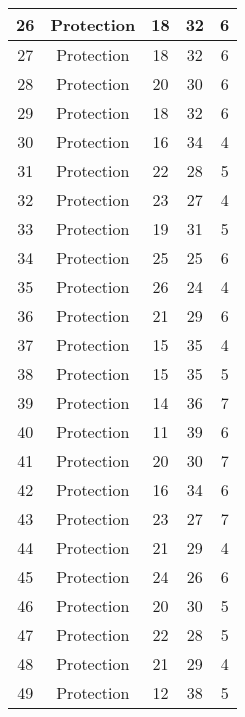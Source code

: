 \documentclass[results.tex]{subfiles}
\begin{document}
\begin{center}
\begin{tabular}{| c || c | c | c | c |}
    \hline
    26 & Protection & 18 & 32 & 6 \\ 
    \hline
    27 & Protection & 18 & 32 & 6 \\ 
    \hline
    28 & Protection & 20 & 30 & 6 \\ 
    \hline
    29 & Protection & 18 & 32 & 6 \\ 
    \hline
    30 & Protection & 16 & 34 & 4 \\ 
    \hline
    31 & Protection & 22 & 28 & 5 \\ 
    \hline
    32 & Protection & 23 & 27 & 4 \\ 
    \hline
    33 & Protection & 19 & 31 & 5 \\ 
    \hline
    34 & Protection & 25 & 25 & 6 \\ 
    \hline
    35 & Protection & 26 & 24 & 4 \\ 
    \hline
    36 & Protection & 21 & 29 & 6 \\ 
    \hline
    37 & Protection & 15 & 35 & 4 \\ 
    \hline
    38 & Protection & 15 & 35 & 5 \\ 
    \hline
    39 & Protection & 14 & 36 & 7 \\ 
    \hline
    40 & Protection & 11 & 39 & 6 \\ 
    \hline
    41 & Protection & 20 & 30 & 7 \\ 
    \hline
    42 & Protection & 16 & 34 & 6 \\ 
    \hline
    43 & Protection & 23 & 27 & 7 \\ 
    \hline
    44 & Protection & 21 & 29 & 4 \\ 
    \hline
    45 & Protection & 24 & 26 & 6 \\ 
    \hline
    46 & Protection & 20 & 30 & 5 \\ 
    \hline
    47 & Protection & 22 & 28 & 5 \\ 
    \hline
    48 & Protection & 21 & 29 & 4 \\ 
    \hline
    49 & Protection & 12 & 38 & 5 \\ 
    \hline   \end{tabular}
\end{center}
\end{document}

